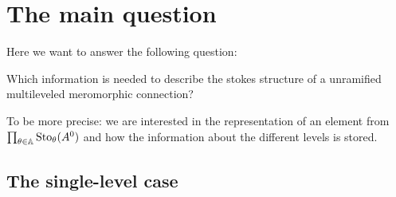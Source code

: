 \section{The main question}
Here we want to answer the following question:
\begin{einr}
  Which information is needed to describe the stokes structure of a unramified
  multileveled meromorphic connection?
\end{einr}
To be more precise: we are interested in the representation of an element from
$\prod_{\theta\in\mathbb{A}}\operatorname{Sto}_\theta(A^0)$ and how the information about the
different levels is stored.

\begin{comment}
  Ideas:
  \begin{enumerate}
    \item see algorithm~\cite[II.3.4]{Loday1994}
    \item search in \cite{Loday2014}
    \item generalize the ideas from \cite{boalch,thboalch}.
  \end{enumerate}
\end{comment}

\subsection{The single-level case}
\begin{comment}
  See \cite{boalch,thboalch}.
\end{comment}
